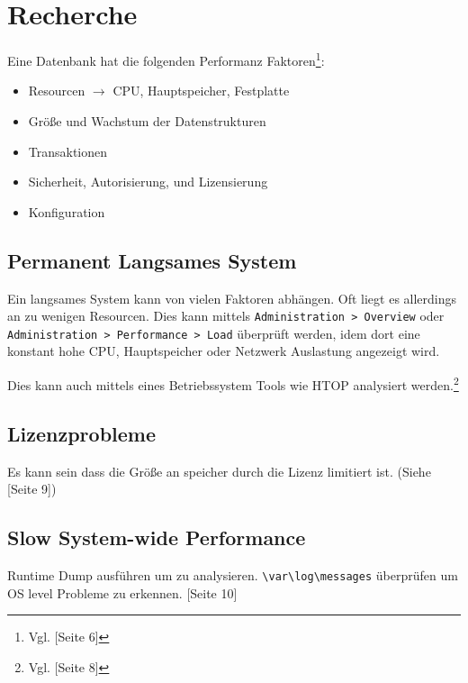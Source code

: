\chapter{Recherche}

Eine Datenbank hat die folgenden Performanz Faktoren\footnote{Vgl. \cite{sap:hana:performance_guide}[Seite 6]}:

\begin{itemize}
	\item Resourcen $\rightarrow$ CPU, Hauptspeicher, Festplatte
	\item Größe und Wachstum der Datenstrukturen
	\item Transaktionen
	\item Sicherheit, Autorisierung, und Lizensierung
	\item Konfiguration
\end{itemize}

\section{Permanent Langsames System}
Ein langsames System kann von vielen Faktoren abhängen.
Oft liegt es allerdings an zu wenigen Resourcen.
Dies kann mittels \verb+Administration > Overview+ oder \\
\verb+Administration > Performance > Load+ überprüft werden,
idem dort eine konstant hohe CPU, Hauptspeicher oder Netzwerk Auslastung angezeigt wird.

Dies kann auch mittels eines Betriebssystem Tools wie HTOP
analysiert werden.\footnote{Vgl. \cite{sap:hana:performance_guide}[Seite 8]}



\section{Lizenzprobleme}
Es kann sein dass die Größe an speicher durch die Lizenz limitiert ist. (Siehe \cite{sap:hana:performance_guide}[Seite 9])

\section{Slow System-wide Performance}
Runtime Dump ausführen um zu analysieren.
\verb+\var\log\messages+ überprüfen um OS level Probleme zu erkennen.
\cite{sap:hana:performance_guide}[Seite 10]


